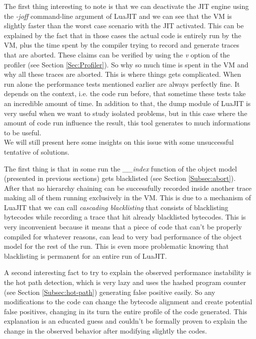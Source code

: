
The first thing interesting to note is that we can deactivate the JIT engine using
the \emph{-joff} command-line argument of LuaJIT and we can see that the VM is
slightly faster than the worst case scenario with the JIT activated. This can
be explained by the fact that in those cases the actual code is entirely run by
the VM, plus the time spent by the compiler trying to record and generate traces
that are aborted. These claims can be verified by using the \emph{v}
option of the profiler (see Section \ref{Sec:Profiler}). So
why so much time is spent in the VM and why all these traces are
aborted. This is where things gets complicated. When run alone the
performance tests mentioned earlier are always perfectly fine. It depends on
the context, i.e. the code run before, that sometime these
tests take an incredible amount of time. In addition to that, the dump module of
LuaJIT is very useful when we want to study isolated problems, but in this case
where the amount of code run influence the result, this tool generates to much
informations to be useful.\\

We will still present here some insights on this issue with some unsuccessful
tentative of solutions.

The first thing is that in some run the \emph{\_\_index}
function of the object model (presented in previous sections) gets blacklisted
(see Section \ref{Subsec:abort}). After that no hierarchy chaining can be
successfully recorded inside another trace making all of them running
exclusively in the VM. This is due to a mechanism of LuaJIT that we can call
\emph{cascading blacklisting} that consists of blacklisting bytecodes while
recording a trace that hit already blacklisted bytecodes. This is very inconvenient
because it means that a piece of code that can't be properly compiled for
whatever reasons, can lead to very bad performance of the object model for the rest of the run.
This is even more problematic knowing that blacklisting is permanent for
an entire run of LuaJIT.

A second interesting fact to try to explain the observed performance instability
is the hot path detection, which is very lazy and uses the hashed program
counter (see Section \ref{Subsec:hot-path}) generating false positive easily.
So any modifications to the code can change the bytecode alignment and create
potential false positives, changing in its turn the entire profile of the code
generated. This explanation is an educated guess and couldn't be formally proven
to explain the change in the observed behavior after modifying slightly the
codes.

